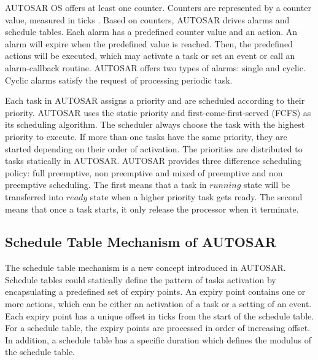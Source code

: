 \documentclass[10pt,conference]{IEEEtran}
\begin{document}
AUTOSAR OS offers at least one counter. Counters are represented by a counter value, measured in ticks \cite{osek}. Based on counters, AUTOSAR drives alarms and schedule tables. Each alarm has a predefined counter value and an action. An alarm will expire when the predefined value is reached. Then, the predefined actions will be executed, which may activate a task or set an event or call an alarm-callback routine. AUTOSAR offers two types of alarms: single and cyclic. Cyclic alarms satisfy the request of processing periodic task. 

Each task in AUTOSAR assigns a priority and are scheduled according to their priority. AUTOSAR uses the static priority and first-come-first-served (FCFS) as its scheduling algorithm. The scheduler always choose the task with the highest priority to execute. If more than one tasks have the same priority, they are started depending on their order of activation. The priorities are distributed to tasks statically in AUTOSAR. AUTOSAR provides three difference scheduling policy: full preemptive, non preemptive and mixed of preemptive and non preemptive scheduling. The first means that a task in $running$ state will be transferred into $ready$ state when a higher priority task gets ready. The second means that once a task starts, it only release the processor when it terminate.

\subsection{Schedule Table Mechanism of AUTOSAR}

The schedule table mechanism is a new concept introduced in AUTOSAR. Schedule tables could statically define the pattern of tasks activation by encapsulating a predefined set of expiry points. An expiry point contains one or more actions, which can be either an activation of a task or a setting of an event. Each expiry point has a unique offset in ticks from the start of the schedule table. For a schedule table, the expiry points are processed in order of increasing offset. In addition, a schedule table has a specific duration which defines the modulus of the schedule table. 
\end{document}
